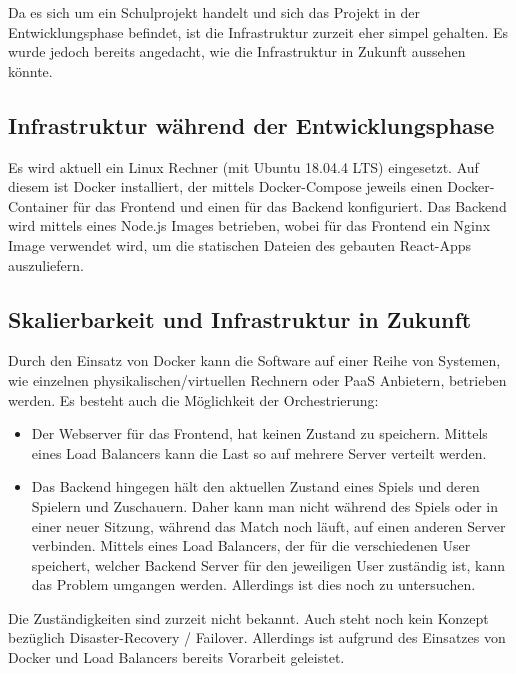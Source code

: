 \documentclass[11pt,a4paper]{scrartcl}
\begin{document}
Da es sich um ein Schulprojekt handelt und sich das Projekt in der Entwicklungsphase befindet, ist die Infrastruktur zurzeit eher simpel gehalten. Es wurde jedoch bereits angedacht, wie die Infrastruktur in Zukunft aussehen könnte.

\subsection{Infrastruktur während der Entwicklungsphase}
Es wird aktuell ein Linux Rechner (mit Ubuntu 18.04.4 LTS) eingesetzt. Auf diesem ist Docker installiert, der mittels Docker-Compose jeweils einen Docker-Container für das Frontend und einen für das Backend konfiguriert. Das Backend wird mittels eines Node.js Images betrieben, wobei für das Frontend ein Nginx Image verwendet wird, um die statischen Dateien des gebauten React-Apps auszuliefern.


\subsection{Skalierbarkeit und Infrastruktur in Zukunft}
Durch den Einsatz von Docker kann die Software auf einer Reihe von Systemen, wie einzelnen physikalischen/virtuellen Rechnern oder PaaS Anbietern, betrieben werden. Es besteht auch die Möglichkeit der Orchestrierung: 
\begin{itemize}
  \item Der Webserver für das Frontend, hat keinen Zustand zu speichern. Mittels eines Load Balancers kann die Last so auf mehrere Server verteilt werden.
  \item Das Backend hingegen hält den aktuellen Zustand eines Spiels und deren Spielern und Zuschauern. Daher kann man nicht während des Spiels oder in einer neuer Sitzung, während das Match noch läuft, auf einen anderen Server verbinden. Mittels eines Load Balancers, der für die verschiedenen User speichert, welcher Backend Server für den jeweiligen User zuständig ist, kann das Problem umgangen werden. Allerdings ist dies noch zu untersuchen.
\end{itemize}

Die Zuständigkeiten sind zurzeit nicht bekannt. Auch steht noch kein Konzept bezüglich Disaster-Recovery / Failover. Allerdings ist aufgrund des Einsatzes von Docker und Load Balancers bereits Vorarbeit geleistet.

\end{document}
